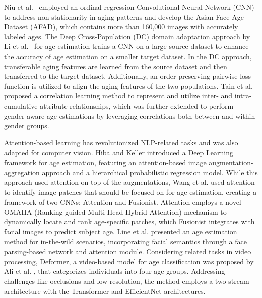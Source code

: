 Niu et al.~\cite{7780901} employed an ordinal regression Convolutional Neural
Network (CNN) to address non-stationarity in aging patterns and develop the
Asian Face Age Dataset (AFAD), which contains more than 160,000 images with
accurately labeled ages. The Deep Cross-Population (DC) domain adaptation
approach by Li et al.~\cite{8578147} for age estimation trains a CNN on a
large source dataset to enhance the accuracy of age estimation on a smaller
target dataset. In the DC approach, transferable aging features are learned
from the source dataset and then transferred to the target dataset.
Additionally, an order-preserving pairwise loss function is utilized to align
the aging features of the two populations. Tain et al.~\cite{TianCCY19}
proposed a correlation learning method to represent and utilize inter- and
intra-cumulative attribute relationships, which was further extended to
perform gender-aware age estimations by leveraging correlations both between
and within gender groups.

Attention-based learning has revolutionized NLP-related tasks and was also
adapted for computer vision. Hiba and Keller \cite{deepage2} introduced a Deep
Learning framework for age estimation, featuring an attention-based image
augmentation-aggregation approach and a hierarchical probabilistic regression
model. While this approach used attention on top of the augmentations, Wang et
al. \cite{9673115} used attention to identify image patches that should be
focused on for age estimation, creating a framework of two CNNs: Attention and
Fusionist. Attention employs a novel OMAHA (Ranking-guided Multi-Head Hybrid
Attention) mechanism to dynamically locate and rank age-specific patches,
which Fusionist integrates with facial images to predict subject age. Line et
al. \cite{lin2021fpage} presented an age estimation method for in-the-wild
scenarios, incorporating facial semantics through a face parsing-based network
and attention module. Considering related tasks in video processing, Deformer,
a video-based model for age classification was proposed by Ali et al.
\cite{Ali_2024_WACV}, that categorizes individuals into four age groups.
Addressing challenges like occlusions and low resolution, the method employs a
two-stream architecture with the Transformer and EfficientNet architectures.

